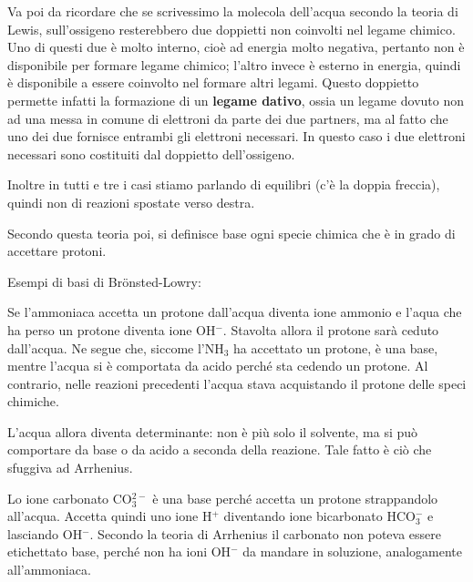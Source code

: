 Va poi da ricordare che se scrivessimo la molecola dell'acqua secondo la teoria di Lewis, sull'ossigeno resterebbero due doppietti non coinvolti nel legame chimico. Uno di questi due è molto interno, cioè ad energia molto negativa, pertanto non è disponibile per formare legame chimico; l'altro invece è esterno in energia, quindi è disponibile a essere coinvolto nel formare altri legami. Questo doppietto permette infatti la formazione di un \textbf{legame dativo}, ossia un legame dovuto non ad una messa in comune di elettroni da parte dei due partners, ma al fatto che uno dei due fornisce entrambi gli elettroni necessari. In questo caso i due elettroni necessari sono costituiti dal doppietto dell'ossigeno.

Inoltre in tutti e tre i casi stiamo parlando di equilibri (c'è la doppia freccia), quindi non di reazioni spostate verso destra.

\vspace{0.2cm}Secondo questa teoria poi, si definisce base ogni specie chimica che è in grado di accettare protoni.

\vspace{0.2cm}Esempi di basi di Brönsted-Lowry:

\vspace{0.2cm}

\vspace{0.2cm}Se l'ammoniaca accetta un protone dall'acqua diventa ione ammonio e l'aqua che ha perso un protone diventa ione OH$^-$. Stavolta allora il protone sarà ceduto dall'acqua. Ne segue che, siccome l'NH$_3$ ha accettato un protone, è una base, mentre l'acqua si è comportata da acido perché sta cedendo un protone. Al contrario, nelle reazioni precedenti l'acqua stava acquistando il protone delle speci chimiche.

L'acqua allora diventa determinante: non è più solo il solvente, ma si può comportare da base o da acido a seconda della reazione. Tale fatto è ciò che sfuggiva ad Arrhenius.

\vspace{0.2cm}

\vspace{0.2cm}Lo ione carbonato CO$_3^{2-}$ è una base perché accetta un protone strappandolo all'acqua. Accetta quindi uno ione H$^+$ diventando ione bicarbonato HCO$_3^-$ e lasciando OH$^-$. Secondo la teoria di Arrhenius il carbonato non poteva essere etichettato base, perché non ha ioni OH$^-$ da mandare in soluzione, analogamente all'ammoniaca.

